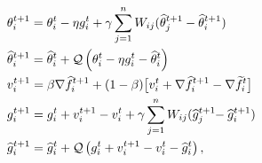 \documentclass{article}
\title{\titlename}
\author{Chung Yiu Yau}
\date{\today}
\newcommand{\prm}{\theta}
\newcommand{\hatprm}{\widehat{\prm}}
\newcommand{\gog}{g}
\newcommand{\hatgog}{\widehat{\gog}}
\newcommand{\ve}{v}
\newcommand{\stocgrdf}{\nabla \widehat{f}}
\newcommand{\stocgrdfp}{\nabla \widetilde{f}}
\begin{document}
\begin{align}
    \hspace{-.2cm} & \prm_i^{t+1} = \prm_i^t - \eta \gog_i^t + \gamma \sum_{j=1}^n W_{ij} ( \hatprm_j^{t+1} - \hatprm_i^{t+1} ) \label{eq:docom_a} \\
    \hspace{-.2cm} & \hatprm_i^{t+1} = \hatprm_i^t + {\cal Q} \left( \prm_i^t - \eta \gog_i^t - \hatprm_i^t \right) \label{eq:docom_b} \\
    \hspace{-.2cm} & \ve_i^{t+1} = \beta \stocgrdf_i^{t+1} + (1-\beta) \big[ \ve_i^t + \stocgrdf_i^{t+1} - \stocgrdfp_i^{t}  \big] \label{eq:docom_c} \\
    \hspace{-.2cm} & \gog_i^{t+1} = \gog_i^t + \ve_i^{t+1} - \ve_i^t + \gamma \sum_{j=1}^n W_{ij} ( \hatgog_j^{t+1} \hspace{-.1cm} - \hatgog_i^{t+1} ) \label{eq:docom_d} \\
    \hspace{-.2cm} & \hatgog_i^{t+1} = \hatgog_i^t + {\cal Q} \left( \gog_i^t + \ve_i^{t+1} - \ve_i^t - \hatgog_i^t \right), \label{eq:docom_e}
\end{align}
\end{document}
